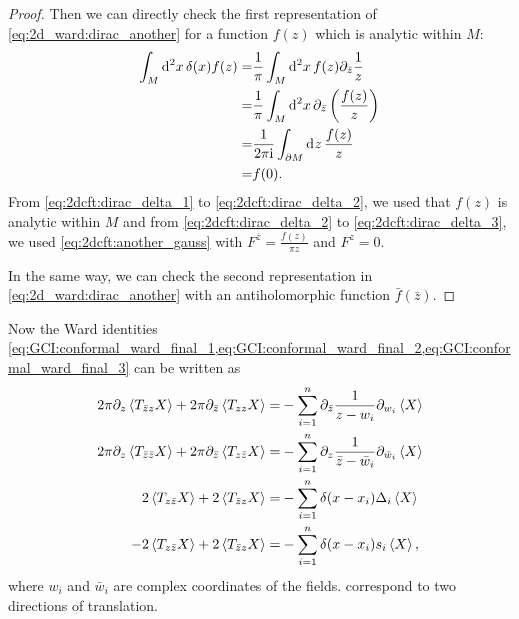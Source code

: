 \documentclass[10pt]{article}
\newcommand{\ii}{\mathrm{i}}
\begin{document}
\begin{proof}
    Then we can directly check the first representation of \cref{eq:2d_ward:dirac_another} for a function $f(z)$ which is analytic within $M$:
    \begin{subequations}
        \begin{align}
            \int_M \dd[2]{x}\delta(x)f(z)= & \frac{1}{\pi}\int_M\dd[2]{x}f(z)\partial_{\bar{z}}\frac{1}{z}\label{eq:2dcft:dirac_delta_1}             \\
            =                              & \frac{1}{\pi}\int_M\dd[2]{x}\partial_{\bar{z}}\left(\frac{f(z)}{z}\right)\label{eq:2dcft:dirac_delta_2} \\
            =                              & \frac{1}{2\pi \ii}\int_{\partial M}\dd[]{z}\frac{f(z)}{z}\label{eq:2dcft:dirac_delta_3}                 \\
            =                              & f(0).\notag
        \end{align}
    \end{subequations}
    From \cref{eq:2dcft:dirac_delta_1} to \cref{eq:2dcft:dirac_delta_2}, we used that $f(z)$ is analytic within $M$ and from \cref{eq:2dcft:dirac_delta_2} to \cref{eq:2dcft:dirac_delta_3}, we used \cref{eq:2dcft:another_gauss} with $F^{\bar{z}}=\frac{f(z)}{\pi z}$ and $F^z=0$.
    
    In the same way, we can check the second representation in \cref{eq:2d_ward:dirac_another} with an antiholomorphic function $\bar{f}(\bar{z})$.
\end{proof}
Now the Ward identities \cref{eq:GCI:conformal_ward_final_1,eq:GCI:conformal_ward_final_2,eq:GCI:conformal_ward_final_3} can be written as
\begin{subequations}
    \begin{align}
        2\pi\partial_z\expval{T_{\bar{z}z}X}+2\pi\partial_{\bar{z}}\expval{T_{zz}X}=             & -\sum_{i=1}^n\partial_{\bar{z}}\frac{1}{z-w_i}\partial_{w_i}\expval{X}\label{eq:2dcft:ward_holo_1}           \\
        2\pi\partial_z\expval{T_{\bar{z}\bar{z}}X}+2\pi\partial_{\bar{z}}\expval{T_{z\bar{z}}X}= & -\sum_{i=1}^n\partial_z\frac{1}{\bar{z}-\bar{w}_i}\partial_{\bar{w}_i}\expval{X}\label{eq:2dcft:ward_holo_2} \\
        2\expval{T_{z\bar{z}}X}+2\expval{T_{\bar{z}z}X}=                                         & -\sum_{i=1}^n\delta(x-x_i)\Delta_i\expval{X}\label{eq:2dcft:ward_holo_3}                                     \\
        -2\expval{T_{z\bar{z}}X}+2\expval{T_{\bar{z}z}X}=                                        & -\sum_{i=1}^n\delta(x-x_i)s_i\expval{X},\label{eq:2dcft:ward_holo_4}
    \end{align}
\end{subequations}
where $w_i$ and $\bar{w}_i$ are complex coordinates of the fields.
 correspond to two directions of translation.
\end{document}
